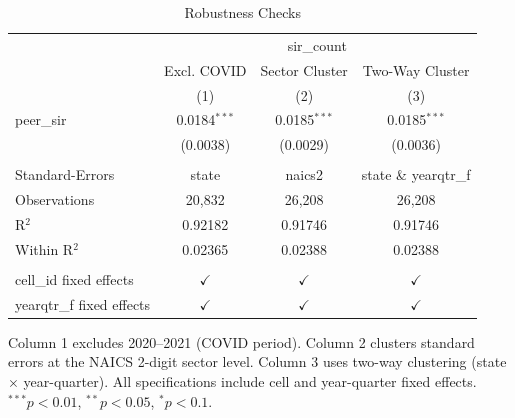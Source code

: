 
\begin{table}[htbp]
   \caption{\label{tab:robustness} Robustness Checks}
   \bigskip
   \centering
   \begin{tabular}{lccc}
      \toprule
       & \multicolumn{3}{c}{sir\_count}\\
                                & Excl. COVID    & Sector Cluster & Two-Way Cluster \\   
                                & (1)            & (2)            & (3)\\  
      \midrule 
      peer\_sir                 & 0.0184$^{***}$ & 0.0185$^{***}$ & 0.0185$^{***}$\\   
                                & (0.0038)       & (0.0029)       & (0.0036)\\   
       \\
      Standard-Errors           & state          & naics2         & state \& yearqtr\_f \\     
      Observations              & 20,832         & 26,208         & 26,208\\  
      R$^2$                     & 0.92182        & 0.91746        & 0.91746\\  
      Within R$^2$              & 0.02365        & 0.02388        & 0.02388\\  
       \\
      cell\_id fixed effects    & $\checkmark$   & $\checkmark$   & $\checkmark$\\   
      yearqtr\_f fixed effects  & $\checkmark$   & $\checkmark$   & $\checkmark$\\   
      \bottomrule
   \end{tabular}
   
   \par \raggedright 
   Column 1 excludes 2020--2021 (COVID period). Column 2 clusters standard errors at the NAICS 2-digit sector level. Column 3 uses two-way clustering (state $\times$ year-quarter). All specifications include cell and year-quarter fixed effects. $^{***}p<0.01$, $^{**}p<0.05$, $^{*}p<0.1$.
\end{table}


